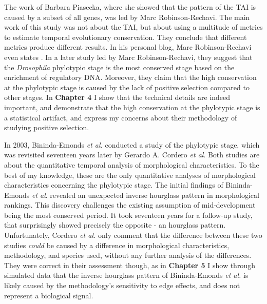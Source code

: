The work of Barbara Piasecka, where she showed that the pattern of the TAI is caused by a subset of all genes, was led by Marc Robinson-Rechavi. The main work of this study was not about the TAI, but about using a multitude of metrics to estimate temporal evolutionary conservation. They conclude that different metrics produce different results. In his personal blog, Marc Robinson-Rechavi even states \cite{robinsonrechaviblog}. In a later study led by Marc Robinson-Rechavi, they suggest that the \textit{Drosophila} phylotypic stage is the most conserved stage based on the enrichment of regulatory DNA. Moreover, they claim that the high conservation at the phylotypic stage is caused by the lack of positive selection compared to other stages. In \textbf{Chapter 4} I show that the technical details are indeed important, and demonstrate that the high conservation at the phylotypic stage is a statistical artifact, and express my concerns about their methodology of studying positive selection. 

In 2003, Bininda-Emonds \textit{et al.} conducted a study of the phylotypic stage, which was revisited seventeen years later by Gerardo A. Cordero \textit{et al}\cite{OlafRP2003, Cordero2020}. Both studies are about the quantitative temporal analysis of morphological characteristics. To the best of my knowledge, these are the only quantitative analyses of morphological characteristics concerning the phylotypic stage. The initial findings of Bininda-Emonds \textit{et al}. revealed an unexpected inverse hourglass pattern in morphological rankings. This discovery challenges the existing assumption of mid-development being the most conserved period. It took seventeen years for a follow-up study, that surprisingly showed precisely the opposite - an hourglass pattern. Unfortunately, Cordero \textit{et al.} only comment that the difference between these two studies \textit{could} be caused by a difference in morphological characteristics, methodology, and species used, without any further analysis of the differences. They were correct in their assessment though, as in \textbf{Chapter 5} I show through simulated data that the inverse hourglass pattern of Bininda-Emonds \textit{et al.} is likely caused by the methodology's sensitivity to edge effects, and does not represent a biological signal.

